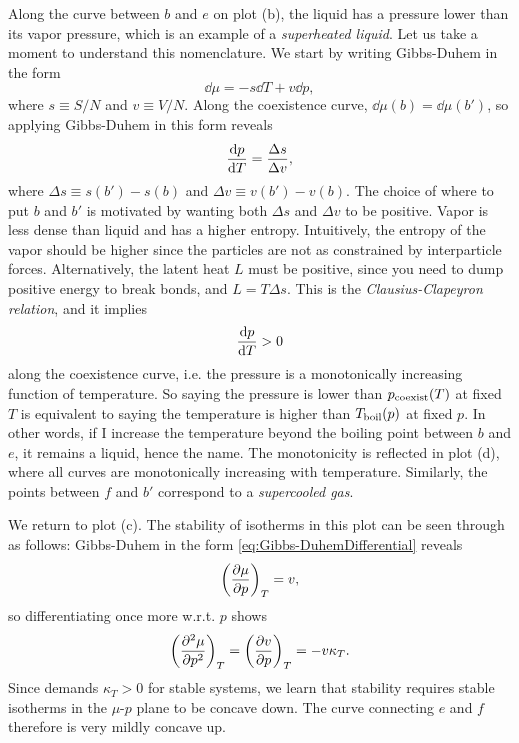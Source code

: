 Along the curve between $b$ and $e$ on plot (b), the liquid has a pressure 
lower than its vapor pressure, which is an example of a {\it
superheated liquid}. Let us take a moment to understand this
nomenclature. We start by writing Gibbs-Duhem in the form
\begin{equation}\label{eq:Gibbs-DuhemDifferential}
\dd{\mu}=-s\dd{T}+v\dd{p},
\end{equation}
where $s\equiv S/N$ and $v\equiv V/N$.
Along the coexistence curve, $\dd{\mu(b)}=\dd{\mu(b')}$, so applying Gibbs-Duhem
in this form reveals
\begin{equation}
\dv{p}{T}=\frac{\Delta s}{\Delta v},
\end{equation}
where $\Delta s\equiv s(b')-s(b)$ and $\Delta v\equiv v(b')-v(b)$. The
choice of where to put $b$ and $b'$ is motivated by wanting both $\Delta s$ and
$\Delta v$ to be positive. Vapor is less dense than liquid and has a higher
entropy. Intuitively, the entropy of the vapor should be higher since the
particles are not as constrained by interparticle forces. Alternatively, the
latent heat $L$ must be positive, since you need to dump positive energy to break
bonds, and $L=T\Delta s$. This is the {\it Clausius-Clapeyron
relation}, and it implies
\begin{equation}
\dv{p}{T}>0
\end{equation}
along the coexistence curve, i.e. the pressure is a monotonically increasing
function of temperature. So saying the pressure is lower than $p_{\rm
coexist}(T)$ at fixed $T$ is equivalent to saying the temperature is higher
than $T_{\rm boil}(p)$ at fixed $p$. In other words, if I increase the
temperature beyond the boiling point between $b$ and $e$, it remains a liquid,
hence the name. The monotonicity is reflected in plot (d), where all curves are
monotonically increasing with temperature. Similarly, the points between 
$f$ and $b'$ correspond to a {\it supercooled gas}.

We return to plot (c). The stability of isotherms in this plot can be
seen through as follows: Gibbs-Duhem in the form
\eqref{eq:Gibbs-DuhemDifferential} reveals
\begin{equation}
\left(\pdv{\mu}{p}\right)_{T}=v,
\end{equation}
so differentiating once more w.r.t. $p$ shows
\begin{equation}
\left(\pdv[2]{\mu}{p}\right)_{T}=\left(\pdv{v}{p}\right)_{T}=-v\kappa_T.
\end{equation}
Since  demands $\kappa_T>0$ for stable systems, we learn
that stability requires stable isotherms in the $\mu$-$p$ plane to be concave down.
The curve connecting $e$ and $f$ therefore is very mildly concave up.

